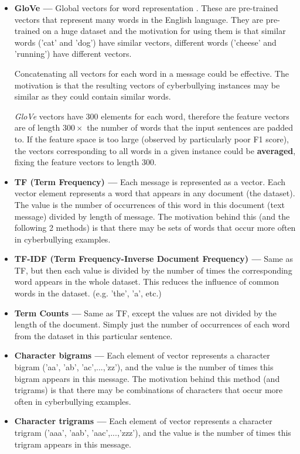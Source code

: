 \documentclass[12pt,a4paper]{article}
\begin{document}
\begin{itemize}
	\item \textbf{GloVe --- } Global vectors for word representation \cite{glove}. These are pre-trained vectors that represent many words in the English language. They are pre-trained on a huge dataset and the motivation for using them is that similar words ('cat' and 'dog') have similar vectors, different words ('cheese' and 'running') have different vectors. 
	
	Concatenating all vectors for each word in a message could be effective. The motivation is that the resulting vectors of cyberbullying instances may be similar as they could contain similar words. 
	
	\textit{GloVe} vectors have 300 elements for each word, therefore the feature vectors are of length $300 \times$ the number of words that the input sentences are padded to. If the feature space is too large (observed by particularly poor F1 score), the vectors corresponding to all words in a given instance could be \textbf{averaged}, fixing the feature vectors to length 300. 
	
	\item \textbf{TF (Term Frequency) --- } Each message is represented as a vector. Each vector element represents a word that appears in any document (the dataset). The value is the number of occurrences of this word in this document (text message) divided by length of message. The motivation behind this (and the following 2 methods) is that there may be sets of words that occur more often in cyberbullying examples.
	
	\item \textbf{TF-IDF (Term Frequency-Inverse Document Frequency) --- } Same as TF, but then each value is divided by the number of times the corresponding word appears in the whole dataset. This reduces the influence of common words in the dataset. (e.g. 'the', 'a', etc.)
	
	\item \textbf{Term Counts --- } Same as TF, except the values are not divided by the length of the document. Simply just the number of occurrences of each word from the dataset in this particular sentence.
	
	\item \textbf{Character bigrams --- } Each element of vector represents a character bigram ('aa', 'ab', 'ac',...,'zz'), and the value is the number of times this bigram appears in this message. The motivation behind this method (and trigrams) is that there may be combinations of characters that occur more often in cyberbullying examples.
	
	\item \textbf{Character trigrams --- } Each element of vector represents a character trigram ('aaa', 'aab', 'aac',...,'zzz'), and the value is the number of times this trigram appears in this message.
\end{itemize}
\end{document}
